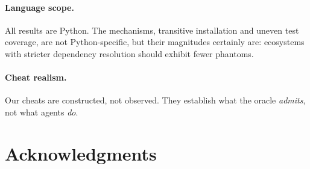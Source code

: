 \documentclass[11pt]{article}
\newif\ifdraft
\newcommand{\todo}[1]{\ifdraft\textcolor{red}{\textbf{[TODO: #1]}}\fi}
\begin{document}
\paragraph{Language scope.}
All results are Python.
The mechanisms, transitive installation and uneven test coverage, are not Python-specific, but their magnitudes certainly are: ecosystems with stricter dependency resolution should exhibit fewer phantoms.

\paragraph{Cheat realism.}
Our cheats are constructed, not observed.
They establish what the oracle \emph{admits}, not what agents \emph{do}.

\section*{Acknowledgments}

\todo{acknowledgments}


\end{document}

